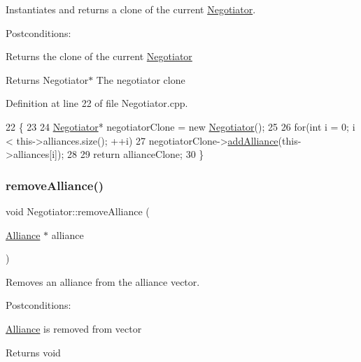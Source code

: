 Instantiates and returns a clone of the current \hyperlink{classNegotiator}{Negotiator}. 

Postconditions\+:
\begin{DoxyItemize}
\item Returns the clone of the current \hyperlink{classNegotiator}{Negotiator}
\end{DoxyItemize}

\begin{DoxyReturn}{Returns}
Negotiator$\ast$ The negotiator clone 
\end{DoxyReturn}


Definition at line 22 of file Negotiator.\+cpp.


\begin{DoxyCode}
22                               \{
23     
24     \hyperlink{classNegotiator}{Negotiator}* negotiatorClone = \textcolor{keyword}{new} \hyperlink{classNegotiator_aa667cc5e0bca1109e2eae6d84e8ba3d9}{Negotiator}();
25 
26     \textcolor{keywordflow}{for}(\textcolor{keywordtype}{int} i = 0; i < this->alliances.size(); ++i)
27         negotiatorClone->\hyperlink{classNegotiator_ac8df6d3b6d75212252eecf1b50ecc8d4}{addAlliance}(this->alliances[i]);
28 
29         \textcolor{keywordflow}{return} allianceClone;
30 \}
\end{DoxyCode}
\mbox{\label{classNegotiator_a07c553b2540ed330d96decdae3ef2068}} 
\subsubsection{\texorpdfstring{remove\+Alliance()}{removeAlliance()}}
{\footnotesize\ttfamily void Negotiator\+::remove\+Alliance (\begin{DoxyParamCaption}\item[{\hyperlink{classAlliance}{Alliance} $\ast$}]{alliance }\end{DoxyParamCaption})}



Removes an alliance from the alliance vector. 

Postconditions\+:
\begin{DoxyItemize}
\item \hyperlink{classAlliance}{Alliance} is removed from vector
\end{DoxyItemize}

\begin{DoxyReturn}{Returns}
void 
\end{DoxyReturn}


